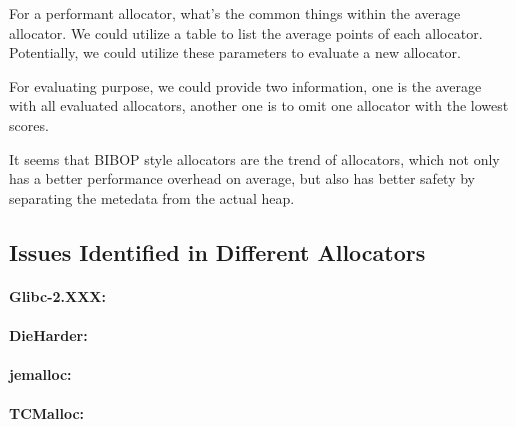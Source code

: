 For a performant allocator, what's the common things within the average allocator. We could utilize a table to list the average points of each allocator. Potentially, we could utilize these parameters to evaluate a new allocator. 

For evaluating purpose, we could provide two information, one is the average with all evaluated allocators, another one is to omit one allocator with the lowest scores. 


It seems that BIBOP style allocators are the trend of allocators, which not only has a better performance overhead on average, but also has better safety by separating the metedata from the actual heap. 

\subsection{Issues Identified in Different Allocators}

\paragraph{Glibc-2.XXX:}

\paragraph{DieHarder:}

\paragraph{jemalloc:}

\paragraph{TCMalloc:}

